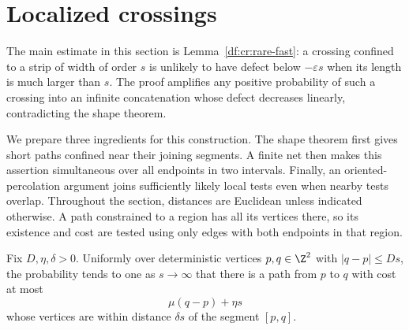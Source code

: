 \section{Localized crossings}\label{df:sec:crossings}

The main estimate in this section is Lemma~\ref{df:cr:rare-fast}: a crossing
confined to a strip of width of order $s$ is unlikely to have defect below
$-\varepsilon s$ when its length is much larger than $s$. The proof amplifies
any positive probability of such a crossing into an infinite concatenation
whose defect decreases linearly, contradicting the shape theorem.

We prepare three ingredients for this construction. The shape theorem first
gives short paths confined near their joining segments. A finite net then
makes this assertion simultaneous over all endpoints in two intervals.
Finally, an oriented-percolation argument joins sufficiently likely local
tests even when nearby tests overlap. Throughout the section, distances are
Euclidean unless indicated otherwise. A path constrained to a region has
all its vertices there, so its existence and cost are tested using only
edges with both endpoints in that region.

\begin{lemma}\label{df:cr:local-travel}
Fix $D,\eta,\delta>0$. Uniformly over deterministic vertices $p,q\in\Z^2$
with $|q-p|\le Ds$, the probability tends to one as $s\to\infty$
that there is a path from $p$ to $q$ with cost at most
\[
  \mu(q-p)+\eta s
\]
whose vertices are within distance $\delta s$ of the segment $[p,q]$.
\end{lemma}

